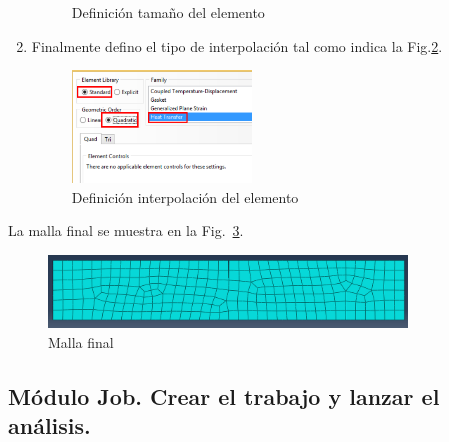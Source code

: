 \begin{enumerate}
\begin{figure}[!h]
\begin{center}
      \end{center}
      \caption{Definición tamaño del elemento}
      \label{mess03}
    \end{figure}
  \item Finalmente defino el tipo de interpolación tal como indica la
    Fig.\ref{mess04}.
    \begin{figure}[!h]
      \begin{center}
        \includegraphics[width=0.45\textwidth]{./body/images/mess04.pdf}
      \end{center}
      \caption{Definición interpolación del elemento}
      \label{mess04}
    \end{figure}
  \end{enumerate}

  La malla final se muestra en la Fig.~\ref{mess05}.
  \begin{figure}[!h]
    \begin{center}
      \includegraphics[width=0.85\textwidth]{./body/images/mess05}
    \end{center}
    \caption{Malla final}
    \label{mess05}
  \end{figure}

  \subsection{Módulo Job. Crear el trabajo y lanzar el análisis.}

